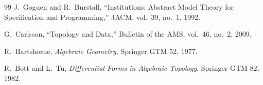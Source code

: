 \documentclass[11pt]{article}
\begin{document}
\begin{thebibliography}{99}
J.~Goguen and R.~Burstall, ``Institutions: Abstract Model Theory for
Specification and Programming,'' JACM, vol.~39, no.~1, 1992.

G.~Carlsson, ``Topology and Data,'' Bulletin of the AMS, vol.~46,
no.~2, 2009.

R.~Hartshorne, \emph{Algebraic Geometry}, Springer GTM 52, 1977.

R.~Bott and L.~Tu, \emph{Differential Forms in Algebraic Topology},
Springer GTM 82, 1982.

\end{thebibliography}
\end{document}
